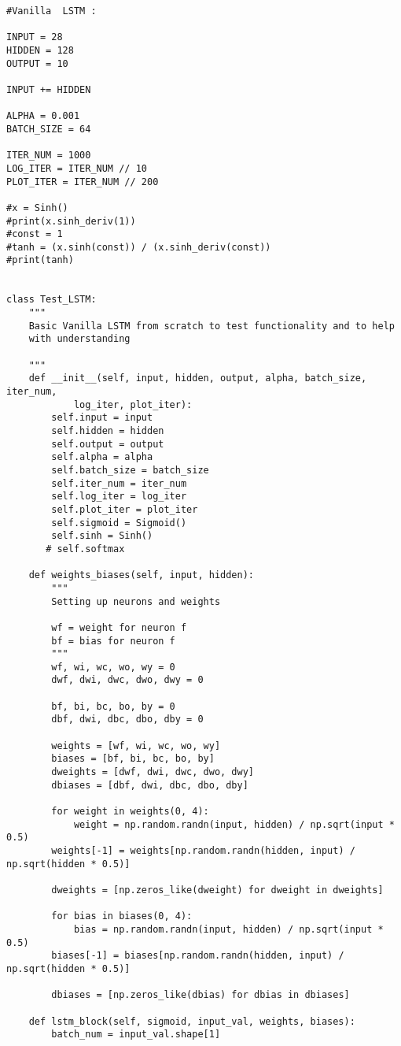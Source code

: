 \documentclass{article}
\begin{document}
\begin{lstlisting}
#Vanilla  LSTM :

INPUT = 28
HIDDEN = 128
OUTPUT = 10

INPUT += HIDDEN

ALPHA = 0.001
BATCH_SIZE = 64

ITER_NUM = 1000
LOG_ITER = ITER_NUM // 10
PLOT_ITER = ITER_NUM // 200

#x = Sinh()
#print(x.sinh_deriv(1))
#const = 1
#tanh = (x.sinh(const)) / (x.sinh_deriv(const))
#print(tanh)


class Test_LSTM:
    """
    Basic Vanilla LSTM from scratch to test functionality and to help
    with understanding

    """
    def __init__(self, input, hidden, output, alpha, batch_size, iter_num,
            log_iter, plot_iter):
        self.input = input
        self.hidden = hidden
        self.output = output
        self.alpha = alpha
        self.batch_size = batch_size
        self.iter_num = iter_num
        self.log_iter = log_iter
        self.plot_iter = plot_iter
        self.sigmoid = Sigmoid()
        self.sinh = Sinh()
       # self.softmax

    def weights_biases(self, input, hidden):
        """
        Setting up neurons and weights

        wf = weight for neuron f
        bf = bias for neuron f
        """
        wf, wi, wc, wo, wy = 0
        dwf, dwi, dwc, dwo, dwy = 0

        bf, bi, bc, bo, by = 0
        dbf, dwi, dbc, dbo, dby = 0

        weights = [wf, wi, wc, wo, wy]
        biases = [bf, bi, bc, bo, by]
        dweights = [dwf, dwi, dwc, dwo, dwy]
        dbiases = [dbf, dwi, dbc, dbo, dby]

        for weight in weights(0, 4):
            weight = np.random.randn(input, hidden) / np.sqrt(input * 0.5)
        weights[-1] = weights[np.random.randn(hidden, input) / np.sqrt(hidden * 0.5)]

        dweights = [np.zeros_like(dweight) for dweight in dweights]

        for bias in biases(0, 4):
            bias = np.random.randn(input, hidden) / np.sqrt(input * 0.5)
        biases[-1] = biases[np.random.randn(hidden, input) / np.sqrt(hidden * 0.5)]

        dbiases = [np.zeros_like(dbias) for dbias in dbiases]

    def lstm_block(self, sigmoid, input_val, weights, biases):
        batch_num = input_val.shape[1]


\end{lstlisting}
\end{document}
